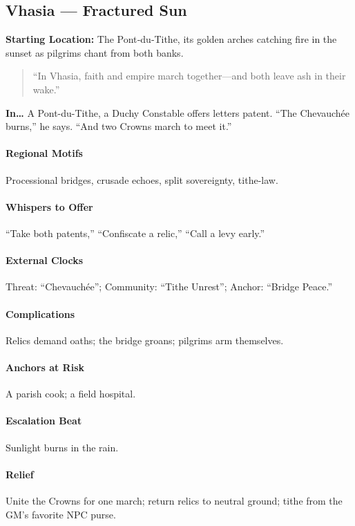 \subsection*{Vhasia — Fractured Sun}
\textbf{Starting Location:} The Pont‑du‑Tithe, its golden arches catching fire in the sunset as pilgrims chant from both banks.
\begin{quote}
“In Vhasia, faith and empire march together—and both leave ash in their wake.”
\end{quote}

\textbf{In…} A Pont-du-Tithe, a Duchy Constable offers letters patent. ``The Chevauchée burns,'' he says. ``And two Crowns march to meet it.''
\paragraph{Regional Motifs} Processional bridges, crusade echoes, split sovereignty, tithe-law.
\paragraph{Whispers to Offer} ``Take both patents,'' ``Confiscate a relic,'' ``Call a levy early.''
\paragraph{External Clocks} Threat: ``Chevauchée''; Community: ``Tithe Unrest''; Anchor: ``Bridge Peace.''
\paragraph{Complications} Relics demand oaths; the bridge groans; pilgrims arm themselves.
\paragraph{Anchors at Risk} A parish cook; a field hospital.
\paragraph{Escalation Beat} Sunlight burns in the rain.
\paragraph{Relief} Unite the Crowns for one march; return relics to neutral ground; tithe from the GM’s favorite NPC purse.
